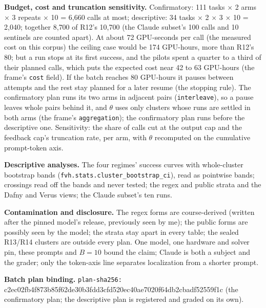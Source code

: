 \documentclass[11pt]{article}
\begin{document}
\begin{answer}
\textbf{Budget, cost and truncation sensitivity.} Confirmatory: 111 tasks
$\times$ 2 arms $\times$ 3 repeats $\times$ 10 = 6{,}660 calls at most;
descriptive: 34 tasks $\times$ 2 $\times$ 3 $\times$ 10 = 2{,}040;
together 8{,}700 of R12's 10,700 (the Claude subset's 100 calls and 10
sentinels are counted apart). At about 72 GPU-seconds per call (the measured cost
on this corpus) the ceiling case would be 174 GPU-hours, more than R12's 80; but
a run stops at its first success, and the pilots spent a quarter to a third of
their planned calls, which puts the expected cost near 42 to 63 GPU-hours (the
frame's \texttt{cost} field). If the batch
reaches 80 GPU-hours it pauses between attempts and the rest stay planned for a
later resume (the stopping rule). The confirmatory plan runs its two arms in
adjacent pairs (\texttt{interleave}), so a pause leaves whole pairs behind it, and
$\theta$ uses only clusters whose runs are settled in both arms (the frame's
\texttt{aggregation}); the confirmatory plan runs before the descriptive one.
Sensitivity: the share of calls cut at the output cap and the feedback cap's
truncation rate, per arm, with $\theta$ recomputed on the cumulative prompt-token
axis.

\textbf{Descriptive analyses.} The four regimes' success curves with
whole-cluster bootstrap bands (\texttt{fvh.stats.cluster\_bootstrap\_ci}), read as
pointwise bands; crossings read off the bands and never tested; the regex and
public strata and the Dafny and Verus views; the Claude subset's ten runs.

\textbf{Contamination and disclosure.} The regex forms are course-derived
(written after the pinned model's release, previously seen by me); the public
forms are possibly seen by the model; the strata stay apart in every table; the
sealed R13/R14 clusters are outside every plan. One model, one hardware and solver
pin, these prompts and $B = 10$ bound the claim; Claude is both a subject and the
grader; only the token-axis line separates localization from a shorter prompt.

\textbf{Batch plan binding.} \texttt{plan-sha256:} c2ec02fb4f873b85f62de30b3fdd3cfd520ec40ae7020f64db2cbadf52559f1c (the confirmatory plan;
the descriptive plan is registered and graded on its own).
\end{answer}
\end{document}
